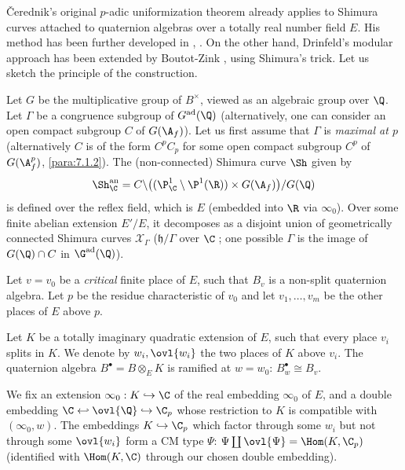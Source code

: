 \begin{para}\label{para:7.5.2}
 \v{C}erednik's original $p$-adic uniformization theorem
 already applies to Shimura curves attached to quaternion algebras over
 a totally real number field $E$. His method has been further developed
 in \cite{varshavsky98:_shimur}, \cite{varshavsky98:_shimur_ii}. On the
 other hand, Drinfeld's modular 
 approach has been extended by Boutot-Zink \cite{tpuosc}, using Shimura's
 trick. Let us sketch the principle of the construction.


 Let $G$ be the multiplicative group of $B^\times$, viewed as an
 algebraic group over $\Q$. Let $\Gamma$ be a congruence subgroup of
 $G^{\mathrm{ad}}(\Q)$ (alternatively, one can consider an open compact
 subgroup 
 $C$ of $G(\A_f)$). Let us first assume that $\Gamma$ is {\it maximal at
 $p$} (alternatively $C$ is of the form $C^pC_p$ for some open compact
 subgroup $C^p$ of $G(\A_f^p)$, \cf \ref{para:7.1.2}). The (non-connected) Shimura
 curve $\Sh$ given by
 \begin{equation*}
  \Sh_\C^{\mathrm{an}}= C\backslash \bigl((\P_\C^1\setminus\P^1(\R)) \times
   G(\A_f)\bigr) /G(\Q)
 \end{equation*}
 is defined over the reflex field, which is $E$ (embedded into $\R$ via
 $\infty_0$). Over some finite abelian extension $E'/E$, it decomposes as
 a disjoint union of geometrically connected Shimura curves
 $\mathcal{X}_\Gamma$ ($\mathfrak{h}/\Gamma$ over $\C\;$; one possible
 $\Gamma$ is the image of $G(\Q)\cap C$ in $\G^{\mathrm{ad}}(\Q)$).


 Let $v=v_0$ be a {\it critical} finite place of $E$, \ie such that
 $B_v$ is a non-split quaternion algebra. Let $p$ be the residue
 characteristic of $v_0$ and let $v_1,\ldots, v_m$ be the other places
 of $E$ above $p$.


 Let $K$ be a totally imaginary quadratic extension of $E$, such that
 every place $v_i$ splits in $K$. We denote by $w_i, \ovl{w_i}$ the two
 places of $K$ above $v_i$. The quaternion algebra $B^\bullet =
 B\otimes_E K$ is ramified at $w=w_0$: $B^\bullet_w\cong B_v$.


 We fix an extension $\infty_0: K\hookrightarrow \C$ of the real
 embedding $\infty_0$ of $E$, and a double embedding $\C \hookleftarrow
 \ovl{\Q} \hookrightarrow \C_p$ whose restriction to $K$ is compatible
 with $(\infty_0,w)$. The embeddings $K \hookrightarrow \C_p$ which
 factor through some $w_i$ but not through some $\ovl{w_i}$ form a CM
 type $\Psi$: $\Psi\coprod \ovl{\Psi}=\Hom(K,\C_p)$ (identified with
 $\Hom(K,\C)$ through our chosen double embedding).
 


\end{para}
